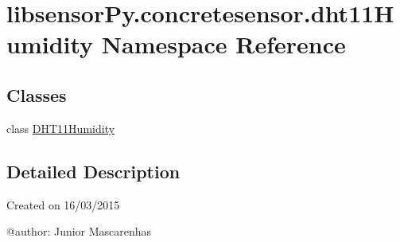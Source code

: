 \hypertarget{namespacelibsensorPy_1_1concretesensor_1_1dht11Humidity}{}\section{libsensor\+Py.\+concretesensor.\+dht11\+Humidity Namespace Reference}
\label{namespacelibsensorPy_1_1concretesensor_1_1dht11Humidity}
\subsection*{Classes}
\begin{DoxyCompactItemize}
\item 
class \hyperlink{classlibsensorPy_1_1concretesensor_1_1dht11Humidity_1_1DHT11Humidity}{D\+H\+T11\+Humidity}
\end{DoxyCompactItemize}


\subsection{Detailed Description}
\begin{DoxyVerb}Created on 16/03/2015

@author: Junior Mascarenhas
\end{DoxyVerb}
 